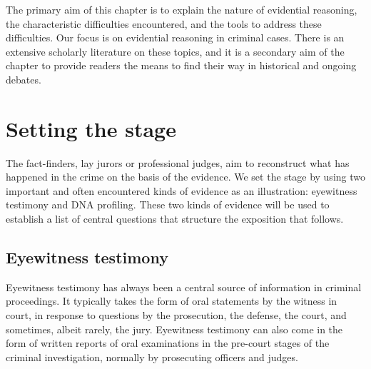 \documentclass[10pt]{article}
\begin{document}
The primary aim of this chapter is to explain the nature of evidential reasoning, the characteristic difficulties encountered, and the tools to address these difficulties. Our focus is on evidential reasoning in criminal cases. There is an extensive scholarly literature on these topics, and it is a secondary aim of the chapter to provide readers the means to find their way in historical and ongoing debates. 



\section{Setting the stage}

The fact-finders, lay jurors or professional judges, aim to reconstruct what has happened in the crime on the basis of the evidence. 
We set the stage by using two important and often encountered kinds of evidence as an illustration: eyewitness testimony and DNA profiling. 
These two kinds of evidence will be used to establish a list of central questions that structure the exposition that follows.

\subsection{Eyewitness testimony}

Eyewitness testimony has always been a central source of information in criminal proceedings. It typically takes the form of oral statements by the witness in court, in response to questions by the prosecution, the defense, the court, and sometimes, albeit rarely, the jury. Eyewitness testimony can also come 
in the form of written reports of oral examinations in the pre-court stages of the criminal investigation, normally by prosecuting officers and judges. 
\end{document}
